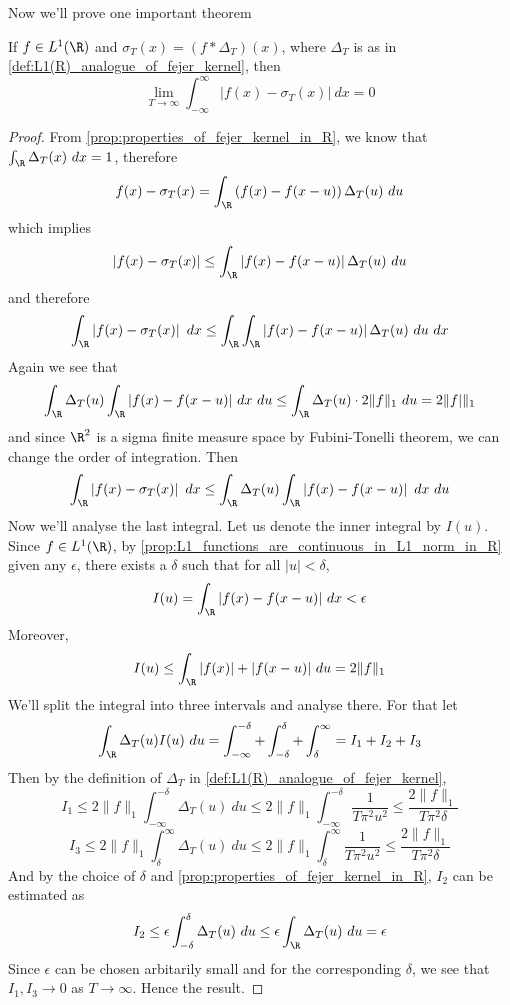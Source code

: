 Now we'll prove one important theorem
\begin{theorem}
  \label{thm:almost_fourier_inversion}
  If $f\in L^1(\R)$ and $\sigma_T(x) = (f*\Delta_T)(x)$, where $\Delta_T$ is as in \autoref{def:L1(R)_analogue_of_fejer_kernel}, then $$\lim_{T\to \infty} \int_{-\infty}^{\infty}|f(x) - \sigma_T(x)| \ dx = 0$$
\end{theorem}
\begin{proof}
  From \autoref{prop:properties_of_fejer_kernel_in_R}, we know that $\int_\R \Delta_T(x) \ dx = 1$, therefore $$f(x) - \sigma_T(x) = \int_\R \left(f(x) - f(x-u)\right) \Delta_T(u) \ du$$
  which implies $$\left|f(x)-\sigma_T(x)\right| \le \int_\R \left|f(x) - f(x-u)\right| \Delta_T(u) \ du$$
  and therefore $$\int_\R \left|f(x)-\sigma_T(x)\right| \ dx \le \int_\R \int_\R \left|f(x) - f(x-u)\right| \Delta_T(u) \ du \ dx$$
  Again we see that $$\int_\R \Delta_T(u) \int_\R |f(x) - f(x-u)| \ dx \ du \le \int_\R \Delta_T(u) \cdot 2\|f\|_1 \ du = 2\|f|\|_1$$
  and since $\R^2$ is a sigma finite measure space by Fubini-Tonelli theorem, we can change the order of integration. Then $$\int_\R \left|f(x)-\sigma_T(x)\right| \ dx \le \int_\R \Delta_T(u) \int_\R \left|f(x) - f(x-u)\right|  \ dx \ du$$
  Now we'll analyse the last integral. Let us denote the inner integral by $I(u)$. Since $f\in L^1(\R)$, by \autoref{prop:L1_functions_are_continuous_in_L1_norm_in_R} given any $\epsilon$, there exists a $\delta$ such that for all $|u| < \delta$, $$I(u) = \int_\R |f(x) - f(x-u)| \ dx < \epsilon$$
  Moreover, $$I(u) \le \int_\R |f(x)| + |f(x-u)| \ du = 2\|f\|_1$$
  We'll split the integral into three intervals and analyse there. For that let $$\int_\R \Delta_T(u) I(u) \ du = \int_{-\infty}^{-\delta}+ \int_{-\delta}^{\delta} + \int^{\infty}_{\delta} = I_1 + I_2 + I_3$$
  Then by the definition of $\Delta_T$ in \autoref{def:L1(R)_analogue_of_fejer_kernel},
  $$I_1 \le 2\|f\|_1 \int_{-\infty}^{-\delta} \Delta_T(u) \ du \le 2\|f\|_1\int_{-\infty}^{-\delta} \frac{1}{T\pi^2 u^2} \le \frac{2\|f\|_1}{T\pi^2 \delta}$$ $$I_3 \le 2\|f\|_1 \int^{\infty}_{\delta} \Delta_T(u) \ du \le 2\|f\|_1\int^{\infty}_{\delta} \frac{1}{T\pi^2 u^2} \le \frac{2\|f\|_1}{T\pi^2 \delta}$$
  And by the choice of $\delta$ and \autoref{prop:properties_of_fejer_kernel_in_R}, $I_2$ can be estimated as $$I_2 \le \epsilon \int_{-\delta}^\delta \Delta_T(u) \ du \le \epsilon \int_\R \Delta_T(u) \ du = \epsilon$$
  Since $\epsilon$ can be chosen arbitarily small and for the corresponding $\delta$, we see that $I_1, I_3 \to 0$ as $T\to \infty$. Hence the result.
\end{proof}

